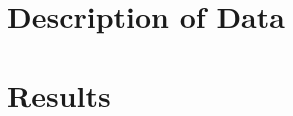 \documentclass[review]{elsarticle}
\begin{document}
\section{Description of Data}




%

\section{Results}
\end{document}
